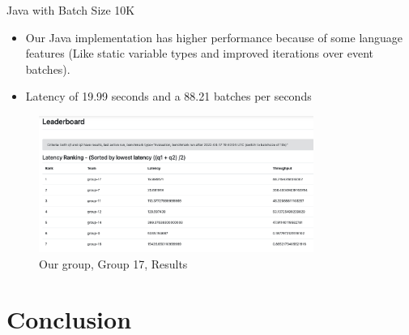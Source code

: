 \documentclass[9pt]{beamer}
\begin{document}
\begin{frame}[fragile]{Java with Batch Size 10K  }
    \begin{itemize}
        \item Our Java implementation has higher performance because of some language features (Like static variable types and improved iterations over event batches).
        \item Latency of 19.99 seconds and a 88.21 batches per seconds
    \end{itemize}

    

    
    \begin{figure}[]
        \begin{center}
            \includegraphics[width=0.8\textwidth]{../DEBS2022-2022-05-28-Throuput.png}
            \caption{Our group, Group 17, Results }
            \label{fig:evaluation}
        \end{center}
    \end{figure}
    
\end{frame}





\section{Conclusion}




\end{document}
